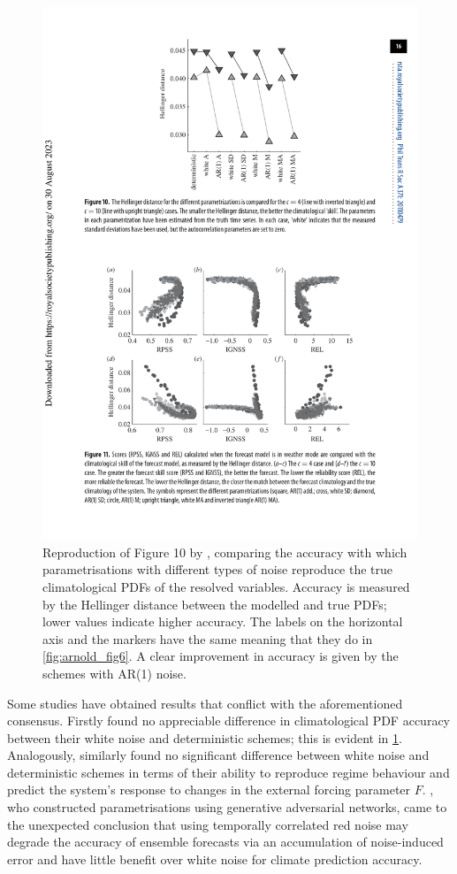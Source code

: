\documentclass[../main.tex]{subfiles}
\begin{document}
\begin{figure}[H]
    \centering
    \includegraphics[width=0.4\linewidth]{figures/arnold2013_fig10.pdf}
    \caption{ Reproduction of Figure 10 by \textcite{arnold2013}, comparing the
        accuracy with which parametrisations with different types of noise
        reproduce the true climatological PDFs of the resolved variables.
        Accuracy is measured by the Hellinger distance between the modelled and
        true PDFs; lower values indicate higher accuracy. The labels on the
        horizontal axis and the markers have the same meaning that they do in
        \cref{fig:arnold_fig6}. A clear improvement in accuracy is given by the
        schemes with AR(1) noise. }
    \label{fig:arnold_fig10}
\end{figure}

Some studies have obtained results that conflict with the aforementioned
consensus. Firstly \textcite{arnold2013} found no appreciable difference in
climatological PDF accuracy between their white noise and deterministic
schemes; this is evident in \cref{fig:arnold_fig10}. Analogously,
\textcite{christensen2015} similarly found no significant difference between
white noise and deterministic schemes in terms of their ability to reproduce
regime behaviour and predict the system's response to changes in the external
forcing parameter $F$. \textcite{gagne2020}, who constructed parametrisations
using generative adversarial networks, came to the unexpected conclusion that
using temporally correlated red noise may degrade the accuracy of ensemble
forecasts via an accumulation of noise-induced error and have little benefit
over white noise for climate prediction accuracy.
\end{document}
